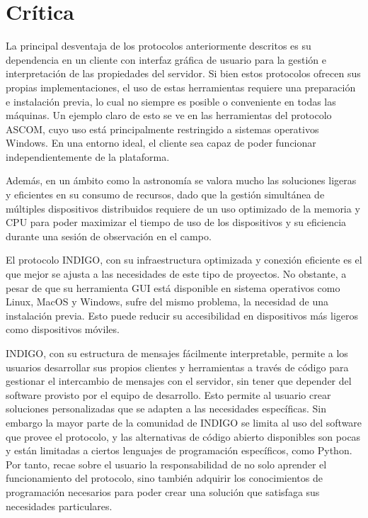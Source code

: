 
\section{Crítica}

La principal desventaja de los protocolos anteriormente descritos es su dependencia en un cliente con interfaz gráfica de usuario para la gestión e interpretación de las propiedades del servidor. Si bien estos protocolos ofrecen sus propias implementaciones, el uso de estas herramientas requiere una preparación e instalación previa, lo cual no siempre es posible o conveniente en todas las máquinas. Un ejemplo claro de esto se ve en las herramientas del protocolo ASCOM, cuyo uso está principalmente restringido a sistemas operativos Windows. En una entorno ideal, el cliente sea capaz de poder funcionar independientemente de la plataforma.

Además, en un ámbito como la astronomía se valora mucho las soluciones ligeras y eficientes en su consumo de recursos, dado que la gestión simultánea de múltiples dispositivos distribuidos requiere de un uso optimizado de la memoria y CPU para poder maximizar el tiempo de uso de los dispositivos y su eficiencia durante una sesión de observación en el campo.


El protocolo INDIGO, con su infraestructura optimizada y conexión eficiente es el que mejor se ajusta a las necesidades de este tipo de proyectos. No obstante, a pesar de que su herramienta GUI está disponible en sistema operativos como Linux, MacOS y Windows, sufre del mismo problema, la necesidad de una instalación previa. Esto puede reducir su accesibilidad en dispositivos más ligeros como dispositivos móviles.

INDIGO, con su estructura de mensajes fácilmente interpretable, permite a los usuarios desarrollar sus propios clientes y herramientas a través de código para gestionar el intercambio de mensajes con el servidor, sin tener que depender del software provisto por el equipo de desarrollo. Esto permite al usuario crear soluciones personalizadas que se adapten a las necesidades específicas. Sin embargo la mayor parte de la comunidad de INDIGO se limita al uso del software que provee el protocolo, y las alternativas de código abierto disponibles son pocas y están limitadas a ciertos lenguajes de programación específicos, como Python. Por tanto, recae sobre el usuario la responsabilidad de no solo aprender el funcionamiento del protocolo, sino también adquirir los conocimientos de programación necesarios para poder crear una solución que satisfaga sus necesidades particulares.


